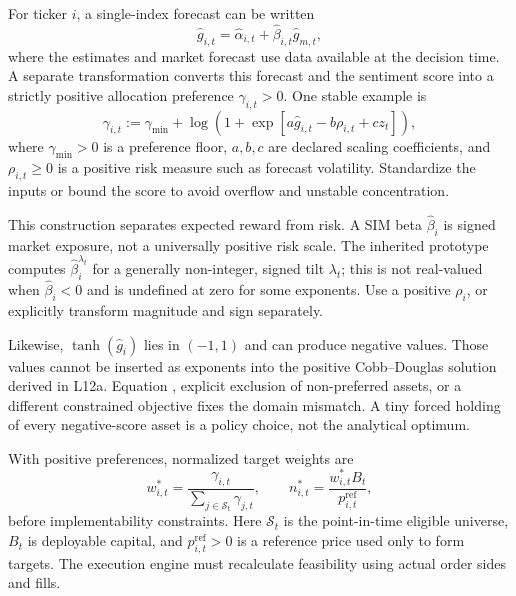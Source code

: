 \documentclass[11pt]{article}
\begin{document}
For ticker $i$, a single-index forecast can be written
\begin{equation}
  \label{eq:sim-forecast}
  \widehat g_{i,t}=\widehat\alpha_{i,t}
  +\widehat\beta_{i,t}\widehat g_{m,t},
\end{equation}
where the estimates and market forecast use data available at the decision time. A separate transformation converts this forecast and the sentiment score into a strictly positive allocation preference $\gamma_{i,t}>0$. One stable example is
\begin{equation}
  \label{eq:positive-preference}
  \gamma_{i,t}:=\gamma_{\min}+
  \log\!\left(1+\exp\!\left[
    a\widehat g_{i,t}-b\rho_{i,t}+cz_t
  \right]\right),
\end{equation}
where $\gamma_{\min}>0$ is a preference floor, $a,b,c$ are declared scaling coefficients, and $\rho_{i,t}\geq0$ is a positive risk measure such as forecast volatility. Standardize the inputs or bound the score to avoid overflow and unstable concentration.

This construction separates expected reward from risk. A SIM beta $\widehat\beta_i$ is signed market exposure, not a universally positive risk scale. The inherited prototype computes $\widehat\beta_i^{\lambda_t}$ for a generally non-integer, signed tilt $\lambda_t$; this is not real-valued when $\widehat\beta_i<0$ and is undefined at zero for some exponents. Use a positive $\rho_i$, or explicitly transform magnitude and sign separately.

Likewise, $\tanh(\widehat g_i)$ lies in $(-1,1)$ and can produce negative values. Those values cannot be inserted as exponents into the positive Cobb--Douglas solution derived in L12a. Equation , explicit exclusion of non-preferred assets, or a different constrained objective fixes the domain mismatch. A tiny forced holding of every negative-score asset is a policy choice, not the analytical optimum.

With positive preferences, normalized target weights are
\begin{equation}
  \label{eq:target-weights}
  w_{i,t}^*=\frac{\gamma_{i,t}}{\sum_{j\in\mathcal S_t}\gamma_{j,t}},
  \qquad
  n_{i,t}^*=\frac{w_{i,t}^*B_t}{p_{i,t}^{\mathrm{ref}}},
\end{equation}
before implementability constraints. Here $\mathcal S_t$ is the point-in-time eligible universe, $B_t$ is deployable capital, and $p_{i,t}^{\mathrm{ref}}>0$ is a reference price used only to form targets. The execution engine must recalculate feasibility using actual order sides and fills.
\end{document}
